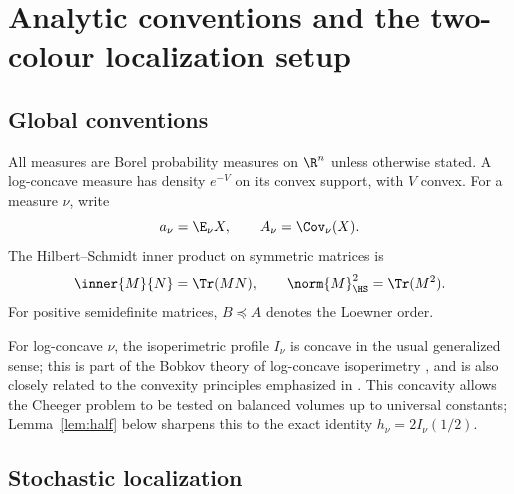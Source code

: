 \documentclass[../../main.tex]{subfiles}
\begin{document}
\section{Analytic conventions and the two-colour localization setup}
\label{sec:notation}

\subsection{Global conventions}

All measures are Borel probability measures on $\R^n$ unless otherwise stated. A log-concave
measure has density $e^{-V}$ on its convex support, with $V$ convex. For a measure $\nu$, write
\[
  a_\nu=\E_\nu X,
  \qquad A_\nu=\Cov_\nu(X).
\]
The Hilbert--Schmidt inner product on symmetric matrices is
\[
  \inner{M}{N}=\Tr(MN),\qquad \norm{M}_{\HS}^2=\Tr(M^2).
\]
For positive semidefinite matrices, $B\preceq A$ denotes the Loewner order.

For log-concave $\nu$, the isoperimetric profile $I_\nu$ is concave in the usual generalized sense;
this is part of the Bobkov theory of log-concave isoperimetry \cite{Bobkov1999LogConcave}, and is also
closely related to the convexity principles emphasized in \cite{Milman2009Isoperimetric}. This
concavity allows the Cheeger problem to be tested on balanced volumes up to universal constants;
Lemma~\ref{lem:half} below sharpens this to the exact identity $h_\nu=2I_\nu(1/2)$.

\subsection{Stochastic localization}
\end{document}
